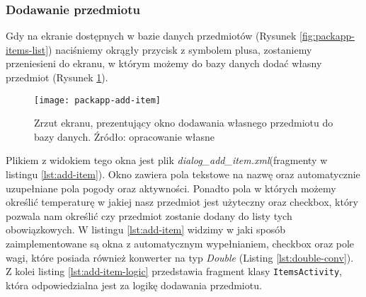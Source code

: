 \documentclass[a4paper,12pt]{article}
\begin{document}
\subsubsection{Dodawanie przedmiotu} \label{przedmiot}

Gdy na ekranie dostępnych w bazie danych przedmiotów (Rysunek \ref{fig:packapp-items-list}) naciśniemy okrągły przycisk z symbolem plusa, zostaniemy przeniesieni do ekranu, w którym możemy do bazy danych dodać własny przedmiot (Rysunek \ref{fig:packapp-add-item}).

\begin{figure}[H]
    \centering
    \texttt{[image: packapp-add-item]}
    \caption{Zrzut ekranu, prezentujący okno dodawania własnego przedmiotu do bazy danych. Źródło: opracowanie własne}
    \label{fig:packapp-add-item}
\end{figure}

Plikiem z widokiem tego okna jest plik \textit{dialog\_add\_item.xml}(fragmenty w listingu \ref{lst:add-item}). Okno zawiera pola tekstowe na nazwę oraz automatycznie uzupełniane pola pogody oraz aktywności. Ponadto pola w których możemy określić temperaturę w jakiej nasz przedmiot jest użyteczny oraz checkbox, który pozwala nam określić czy przedmiot zostanie dodany do listy tych obowiązkowych. W listingu \ref{lst:add-item} widzimy w jaki sposób zaimplementowane są okna z automatycznym wypełnianiem, checkbox oraz pole wagi, które posiada również konwerter na typ \textit{Double} (Listing \ref{lst:double-conv}). Z kolei listing \ref{lst:add-item-logic} przedstawia fragment klasy \texttt{ItemsActivity}, która odpowiedzialna jest za logikę dodawania przedmiotu.
\end{document}
